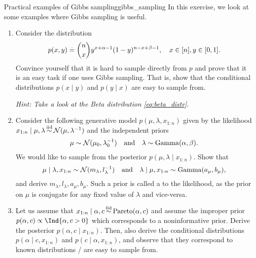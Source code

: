 \begin{nexercise}{Practical examples of Gibbs sampling}{gibbs_sampling}
  In this exercise, we look at some examples where Gibbs sampling is useful.

  \begin{enumerate}
    \item Consider the distribution \begin{align*}
      p(x, y) \overset{.}{=} {n \choose x}y^{x + \alpha - 1}(1-y)^{n - x + \beta - 1}, \quad x \in [n], y \in [0,1].
    \end{align*}
    Convince yourself that it is hard to sample directly from $p$ and prove that it is an easy task if one uses Gibbs sampling. That is, show that the conditional distributions $p(x \mid y)$ and $p(y \mid x)$ are easy to sample from.\par
    \textit{Hint: Take a look at the Beta distribution \eqref{eq:beta_distr}.}

    \item Consider the following generative model $p(\mu, \lambda, x_{1:n})$ given by the likelihood $x_{1:n} \mid \mu, \lambda \iid \N{\mu}{\inv{\lambda}}$ and the independent priors \begin{align*}
      \mu \sim \N{\mu_0}{\inv{\lambda_0}} \quad\text{and}\quad \lambda \sim \GammaDistr{\alpha}{\beta}.
    \end{align*}
    We would like to sample from the posterior $p(\mu, \lambda \mid x_{1:n})$.
    Show that \begin{align*}
      \mu \mid \lambda, x_{1:n} \sim \N{m_\lambda}{\inv{l_\lambda}} \quad\text{and}\quad \lambda \mid \mu, x_{1:n} \sim \GammaDistr{a_\mu}{b_\mu},
    \end{align*} and derive $m_\lambda, l_\lambda, a_\mu, b_\mu$.
    Such a prior is called a  to the likelihood, as the prior on $\mu$ is conjugate for any fixed value of $\lambda$ and vice-versa.

    \item Let us assume that $x_{1:n} \mid \alpha, c \iid \Pareto{\alpha}{c}$ and assume the improper prior $p(\alpha, c) \propto \Ind{\alpha, c > 0}$ which corresponds to a noninformative prior.
    Derive the posterior $p(\alpha, c \mid x_{1:n})$.
    Then, also derive the conditional distributions $p(\alpha \mid c, x_{1:n})$ and $p(c \mid \alpha, x_{1:n})$, and observe that they correspond to known distributions / are easy to sample from.
  \end{enumerate}
\end{nexercise}

